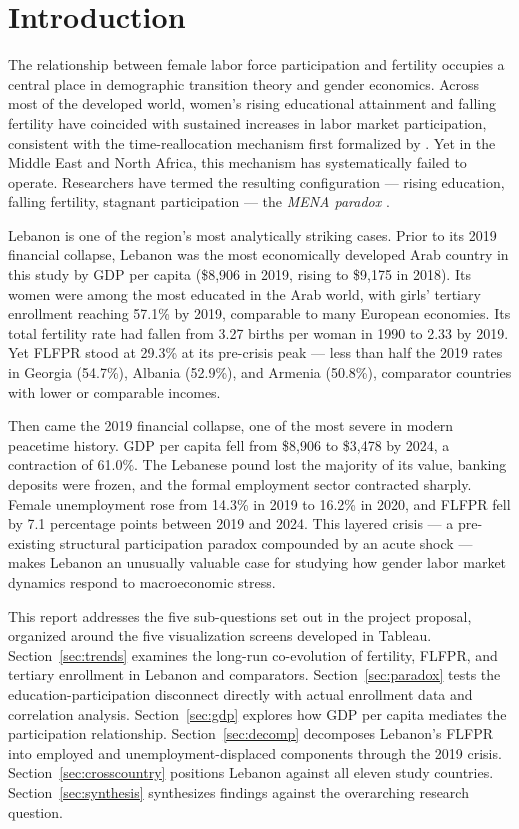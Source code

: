 \documentclass[12pt,a4paper]{article}
\begin{document}
\section{Introduction}
\label{sec:intro}

The relationship between female labor force participation and fertility occupies a central place in demographic transition theory and gender economics. Across most of the developed world, women's rising educational attainment and falling fertility have coincided with sustained increases in labor market participation, consistent with the time-reallocation mechanism first formalized by \citet{becker1965}. Yet in the Middle East and North Africa, this mechanism has systematically failed to operate. Researchers have termed the resulting configuration --- rising education, falling fertility, stagnant participation --- the \textit{MENA paradox} \citep{assaad2020}.

Lebanon is one of the region's most analytically striking cases. Prior to its 2019 financial collapse, Lebanon was the most economically developed Arab country in this study by GDP per capita (\$8{,}906 in 2019, rising to \$9{,}175 in 2018). Its women were among the most educated in the Arab world, with girls' tertiary enrollment reaching 57.1\% by 2019, comparable to many European economies. Its total fertility rate had fallen from 3.27 births per woman in 1990 to 2.33 by 2019. Yet FLFPR stood at 29.3\% at its pre-crisis peak --- less than half the 2019 rates in Georgia (54.7\%), Albania (52.9\%), and Armenia (50.8\%), comparator countries with lower or comparable incomes.

Then came the 2019 financial collapse, one of the most severe in modern peacetime history. GDP per capita fell from \$8{,}906 to \$3{,}478 by 2024, a contraction of 61.0\%. The Lebanese pound lost the majority of its value, banking deposits were frozen, and the formal employment sector contracted sharply. Female unemployment rose from 14.3\% in 2019 to 16.2\% in 2020, and FLFPR fell by 7.1 percentage points between 2019 and 2024. This layered crisis --- a pre-existing structural participation paradox compounded by an acute shock --- makes Lebanon an unusually valuable case for studying how gender labor market dynamics respond to macroeconomic stress.

This report addresses the five sub-questions set out in the project proposal, organized around the five visualization screens developed in Tableau. Section~\ref{sec:trends} examines the long-run co-evolution of fertility, FLFPR, and tertiary enrollment in Lebanon and comparators. Section~\ref{sec:paradox} tests the education-participation disconnect directly with actual enrollment data and correlation analysis. Section~\ref{sec:gdp} explores how GDP per capita mediates the participation relationship. Section~\ref{sec:decomp} decomposes Lebanon's FLFPR into employed and unemployment-displaced components through the 2019 crisis. Section~\ref{sec:crosscountry} positions Lebanon against all eleven study countries. Section~\ref{sec:synthesis} synthesizes findings against the overarching research question.
\end{document}
